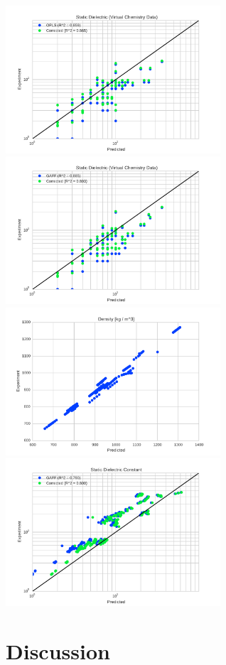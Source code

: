 \documentclass[aps,pre,twocolumn,superscriptaddress]{revtex4-1}
\begin{document}
\includegraphics[width=8.0cm]{./figures/dielectric_virtual_chemistry_opls.pdf}
\includegraphics[width=8.0cm]{./figures/dielectric_virtual_chemistry_gaff.pdf}
\includegraphics[width=8.0cm]{./figures/densities_thermoml.pdf}
\includegraphics[width=8.0cm]{./figures/dielectrics_thermoml.pdf}


\section{Discussion}
\end{document}
